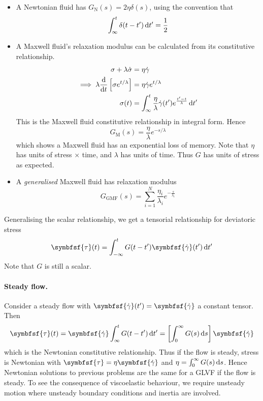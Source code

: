 \documentclass{jknotes}
\begin{document}
\begin{itemize}
	\item A Newtonian fluid has $G_{\text{N}}(s) = 2 \eta \delta(s)$, using the
		convention that
		\begin{equation}
			\int_{\infty}^t \delta(t-t')\,\diffd t' = \frac{1}{2}
		\end{equation}
	\item A Maxwell fluid's relaxation modulus can be calculated from its
		constitutive relationship.
		\begin{align}
			\sigma + \lambda \dot{\sigma} &= \eta \srate \\
			\implies \lambda \frac{\diffd}{\diffd t}\left[\sigma
			e^{t/\lambda}\right] &= \eta \srate e^{t/\lambda} \\
			\sigma(t) &= \int_{\infty}^t \frac{\eta}{\lambda} \srate(t')
				e^{\frac{t'-t}{\lambda}} \, \diffd t'
		\end{align}
		This is the Maxwell fluid constitutive relationship in integral form.
		Hence
		\begin{equation}
			G_{\text{M}}(s) = \frac{\eta}{\lambda} e^{-s/\lambda}
		\end{equation}
		which shows a Maxwell fluid has an exponential loss of memory. Note
		that $\eta$ has units of stress $\times$ time, and $\lambda$ has units
		of time. Thus $G$ has units of stress as expected.
	\item A \emph{generalised} Maxwell fluid has relaxation modulus
		\begin{equation}
			G_{\text{GMF}}(s) = \sum_{i=1}^N \frac{\eta_i}{\lambda_i}
			e^{-\frac{s}{\lambda_i}}
		\end{equation}
\end{itemize}

Generalising the scalar relationship, we get a tensorial relationship for
deviatoric stress
\begin{equation}
	\symbfsf{\tau}(t) = \int_{-\infty}^t G(t-t') \symbfsf{\srate}(t')\,\diffd t'
\end{equation}
Note that $G$ is still a scalar.

\paragraph{Steady flow.} Consider a steady flow with $\symbfsf{\srate}(t') =
\symbfsf{\srate}$ a constant tensor. Then
\begin{equation}
	\symbfsf{\tau}(t) = \symbfsf{\srate} \int_{\infty}^t G(t-t') \, \diffd t' =
	\left[ \int_0^\infty G(s) \, \diffd s \right] \symbfsf{\srate}
\end{equation}
which is the Newtonian constitutive relationship. Thus if the flow is steady,
stress is Newtonian with $\symbfsf{\tau} = \eta \symbfsf{\srate}$ and $\eta =
\int_0^\infty G(s) \, \diffd s$. Hence Newtonian solutions to previous
problems are the same for a GLVF if the flow is steady. To see the consequence
of viscoelastic behaviour, we require unsteady motion where unsteady boundary
conditions and inertia are involved.
\end{document}
